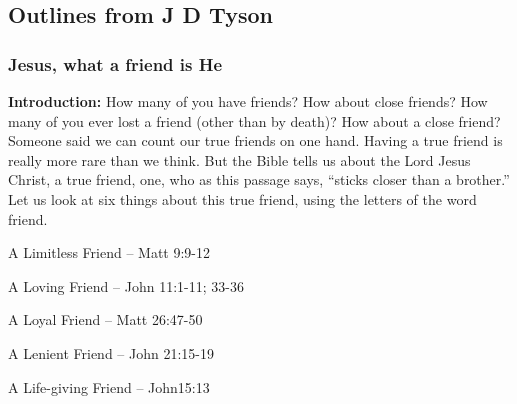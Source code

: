 \subsection{Outlines from J D Tyson}

\subsubsection{Jesus, what a friend is He}

\noindent  \textbf{Introduction: } How many of you have friends? How about close friends? How many of you ever lost a friend (other than by death)? How about a close friend? Someone said we can count our true friends on one hand. Having a true friend is really more rare than we think. But the Bible tells us about the Lord Jesus Christ, a true friend, one, who as this passage says, ``sticks closer than a brother.'' Let us look at six things about this true friend, using the letters of the word friend.
\begin{compactenum}[I.]
    \item A Limitless Friend – Matt 9:9-12
    \item A Loving Friend – John 11:1-11; 33-36
    \item A Loyal Friend – Matt 26:47-50
    \item A Lenient Friend – John 21:15-19
    \item A Life-giving Friend – John15:13
\end{compactenum}




